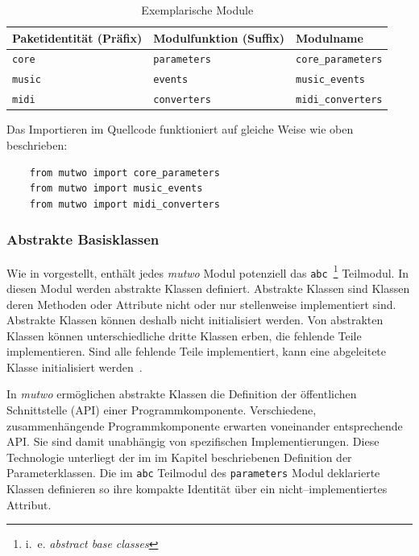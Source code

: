 \documentclass[12pt,a4paper,ngerman]{article}
\begin{document}
\begin{table}[H]
    \begin{center}
        \begin{tabular}{l l l}
            \hline
            Paketidentität (Präfix) & Modulfunktion (Suffix) & Modulname \\ [0.5ex] 
            \hline\hline
            \texttt{core} & \texttt{parameters} & \texttt{core\_parameters} \\
            \texttt{music} & \texttt{events} & \texttt{music\_events} \\
            \texttt{midi} & \texttt{converters} & \texttt{midi\_converters} \\
            \hline
        \end{tabular}
    \end{center}

    \caption{Exemplarische Module}
\end{table}

Das Importieren im Quellcode funktioniert auf gleiche Weise wie oben beschrieben:

\begin{lstlisting}
    from mutwo import core_parameters
    from mutwo import music_events
    from mutwo import midi_converters
\end{lstlisting}

\subsubsection{Abstrakte Basisklassen}
\label{abstractBaseClasses}

Wie in \emph{} vorgestellt, enthält jedes \emph{mutwo} Modul potenziell das \texttt{abc}~\footnote{%
    i.\ e. \emph{abstract base classes}%
} Teilmodul.
In diesen Modul werden abstrakte Klassen definiert.
Abstrakte Klassen sind Klassen deren Methoden oder Attribute nicht oder nur stellenweise implementiert sind.
Abstrakte Klassen können deshalb nicht initialisiert werden.
Von abstrakten Klassen können unterschiedliche dritte Klassen erben, die fehlende Teile implementieren.
Sind alle fehlende Teile implementiert, kann eine abgeleitete Klasse initialisiert werden~\parencite{abstractTypeWiki}.

\bigskip

In \emph{mutwo} ermöglichen abstrakte Klassen die Definition der öffentlichen Schnittstelle (API) einer Programmkomponente.
Verschiedene, zusammenhängende Programmkomponente erwarten voneinander entsprechende API.
Sie sind damit unabhängig von spezifischen Implementierungen.
Diese Technologie unterliegt der im im Kapitel \emph{} beschriebenen Definition der Parameterklassen.
Die im \texttt{abc} Teilmodul des \texttt{parameters} Modul deklarierte Klassen definieren so ihre kompakte Identität über ein nicht--implementiertes Attribut.
\end{document}
